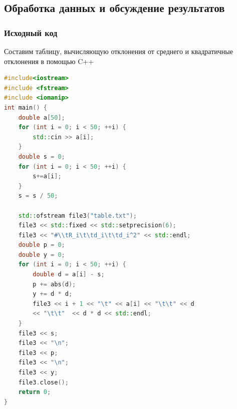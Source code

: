 \documentclass[14pt,a4paper]{extarticle}
\begin{document}
\subsection{Обработка данных и обсуждение результатов}
\subsubsection*{Исходный код}
Составим таблицу, вычисляющую отклонения от среднего и квадратичные отклонения в помощью C++
\begin{lstlisting}[language=C++]
#include<iostream>
#include <fstream>
#include <iomanip>
int main() {
	double a[50];
	for (int i = 0; i < 50; ++i) {
		std::cin >> a[i];
	}
	double s = 0;
	for (int i = 0; i < 50; ++i) {
		s+=a[i];
	}
	s = s / 50;

    std::ofstream file3("table.txt");
    file3 << std::fixed << std::setprecision(6);
    file3 << "#\\tR_i\t\td_i\t\td_i^2" << std::endl;
	double p = 0;
	double y = 0;
    for (int i = 0; i < 50; ++i) {
        double d = a[i] - s;
		p += abs(d);
		y += d * d;
        file3 << i + 1 << "\t" << a[i] << "\t\t" << d
        << "\t\t"  << d * d << std::endl;
    }
	file3 << s;
	file3 << "\n";
	file3 << p;
	file3 << "\n";
	file3 << y;
    file3.close();
    return 0;
}
\end{lstlisting}
\newpage
\end{document}
